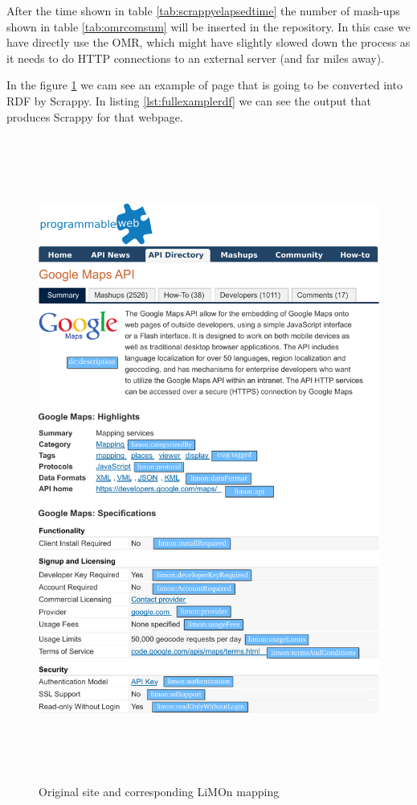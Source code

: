 After the time shown in table \ref{tab:scrappyelapsedtime} the number of mash-ups shown in table \ref{tab:omrcomsum} will be inserted in the repository. In this case we have directly use the OMR, which might have slightly slowed down the process as it needs to do HTTP connections to an external server (and far miles away).

In the figure \ref{fig:programmablewebgoogle} we cam see an example of page that is going to be converted into RDF by Scrappy. In listing \ref{lst:fullexamplerdf} we can see the output that produces Scrappy for that webpage.

\begin{figure}[ht!]
	\centering
	\includegraphics[height=600pt]{graphics/programmable_tags.pdf}
	\caption{Original site and corresponding LiMOn mapping}
	\label{fig:programmablewebgoogle}
\end{figure}

